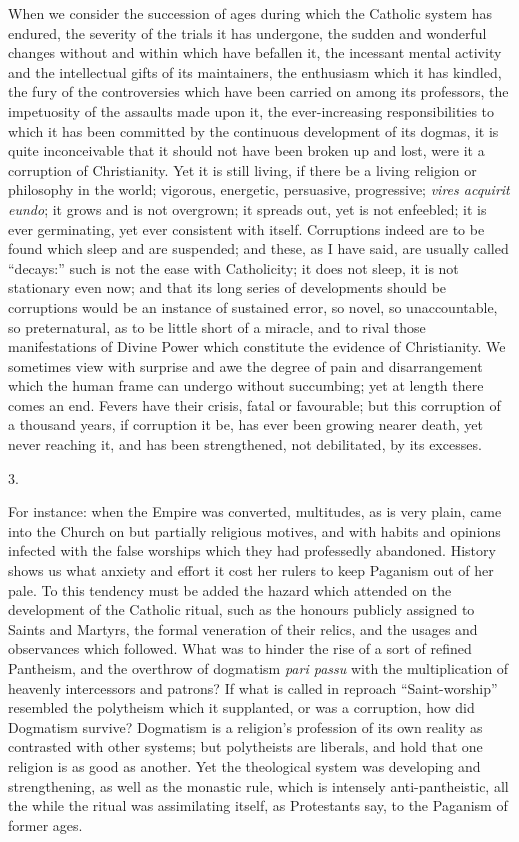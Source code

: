 When we consider the succession of ages during which the Catholic
system has endured, the severity of the trials it has undergone, the
sudden and wonderful changes without and within which have befallen
it, the incessant mental activity and the intellectual gifts of its
maintainers, the enthusiasm which it has kindled, the fury of the
controversies which have been carried on among its professors, the
impetuosity of the assaults made upon it, the ever-increasing
responsibilities to which it has been committed by the continuous
development of its dogmas, it is quite inconceivable that it should
not have been broken up and lost, were it a corruption of
Christianity. Yet it is still living, if there be a living religion or
philosophy in the world; vigorous, energetic, persuasive, progressive;
\emph{vires acquirit eundo}; it grows and is not overgrown; it spreads
out, yet is not enfeebled; it is ever germinating, yet ever consistent
with itself. Corruptions indeed are to be found which sleep and are
suspended; and these, as I have said, are usually called
``decays:'' such is not the ease with Catholicity; it does not
sleep, it is not stationary even now; and that its long series of
developments should be corruptions would be an instance of sustained
error, so novel, so unaccountable, so preternatural, as to be little
short of a miracle, and to rival those manifestations of Divine Power
which constitute the evidence of Christianity. We sometimes view with
surprise and awe the degree of pain and disarrangement which the human
frame can undergo without succumbing; yet at length there comes an
end. Fevers have their crisis, fatal or favourable; but this
corruption of a thousand years, if corruption it be, has ever been
growing nearer death, yet never reaching it, and has been
strengthened, not debilitated, by its excesses.

3.

For instance: when the Empire was converted, multitudes, as is very
plain, came into the Church on but partially religious motives, and
with habits and opinions infected with the false worships which they
had professedly abandoned. History shows us what anxiety and effort it
cost her rulers to keep Paganism out of her pale. To this tendency
must be added the hazard which attended on the development of the
Catholic ritual, such as the honours publicly assigned to Saints and
Martyrs, the formal veneration of their relics, and the usages and
observances which followed. What was to hinder the rise of a sort of
refined Pantheism, and the overthrow of dogmatism \emph{pari passu}
with the multiplication of heavenly intercessors and patrons? If what
is called in reproach ``Saint-worship'' resembled the
polytheism which it supplanted, or was a corruption, how did Dogmatism
survive? Dogmatism is a religion's profession of its own reality as
contrasted with other systems; but polytheists are liberals, and hold
that one religion is as good as another. Yet the theological system
was developing and strengthening, as well as the monastic rule, which
is intensely anti-pantheistic, all the while the ritual was
assimilating itself, as Protestants say, to the Paganism of former
ages.

